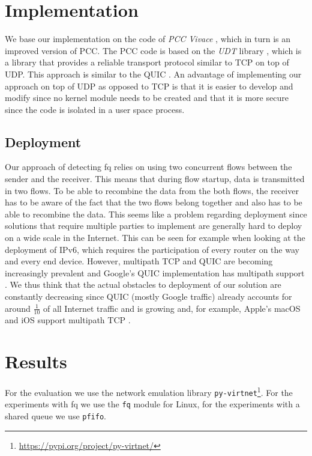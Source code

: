 \documentclass[runningheads]{llncs}
\begin{document}
\section{Implementation}

We base our implementation on the code of \textit{PCC Vivace} \cite{dong_pcc_2018}, which in turn is an improved version of PCC. The PCC code is based on the \textit{UDT} library \cite{gu_udt_2007}, which is a library that provides a reliable transport protocol similar to TCP on top of UDP. This approach is similar to the QUIC \cite{iyengar_quic_2018}. An advantage of implementing our approach on top of UDP as opposed to TCP is that it is easier to develop and modify since no kernel module needs to be created and that it is more secure since the code is isolated in a user space process. 

\subsection{Deployment}

Our approach of detecting \gls{fq} relies on using two concurrent flows between the sender and the receiver. This means that during flow startup, data is transmitted in two flows. To be able to recombine the data from the both flows, the receiver has to be aware of the fact that the two flows belong together and also has to be able to recombine the data. This seems like a problem regarding deployment since solutions that require multiple parties to implement are generally hard to deploy on a wide scale in the Internet. This can be seen for example when looking at the deployment of IPv6, which requires the participation of every router on the way and every end device. However, multipath TCP \cite{handley_tcp_2012} and QUIC are becoming increasingly prevalent and Google's QUIC implementation has multipath support \cite{google_quiche_2020}. We thus think that the actual obstacles to deployment of our solution are constantly decreasing since QUIC (mostly Google traffic) already accounts for around $\frac{1}{10}$ of all Internet traffic \cite{ruth_first_2018} and is growing and, for example, Apple's macOS and iOS support multipath TCP \cite{apple_about_2018}. 

\section{Results}

For the evaluation we use the network emulation library \texttt{py-virtnet}\footnote{\url{https://pypi.org/project/py-virtnet/}}. For the experiments with \gls{fq} we use the \texttt{fq} module for Linux, for the experiments with a shared queue we use \texttt{pfifo}. 
\end{document}
